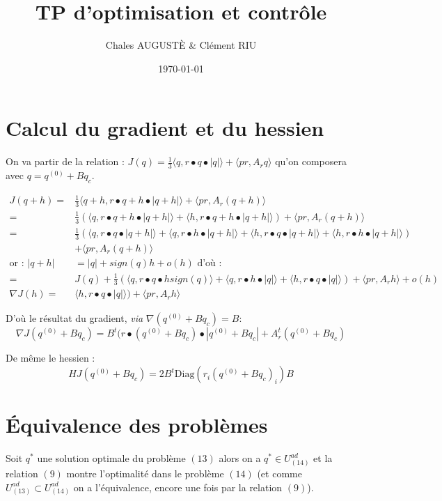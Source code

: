 \documentclass[12pt, letterpaper]{article}
\title{TP d'optimisation et contrôle}
\author{Chales AUGUSTÈ \& Clément RIU}
\date{\today}
\begin{document}
\section{Calcul du gradient et du hessien}

On va partir de la relation : $ J(q) = \frac{1}{3}\langle q , r \bullet q \bullet | q | \rangle + \langle pr , A_r q \rangle$ qu'on composera avec $q = q^{(0)} + B q_c$.

\begin{align*}
J(q+h) =& \frac{1}{3}\langle q + h , r \bullet q + h \bullet | q + h | \rangle + \langle pr , A_r (q + h) \rangle \\
=& \frac{1}{3}(\langle q , r \bullet q + h \bullet | q + h | \rangle + \langle h , r \bullet q + h \bullet | q + h | \rangle) + \langle pr , A_r (q + h) \rangle \\
=& \frac{1}{3}(\langle q , r \bullet q \bullet | q + h | \rangle + \langle q , r \bullet h \bullet | q + h | \rangle + \langle h , r \bullet q \bullet | q + h | \rangle + \langle h , r \bullet h \bullet | q + h | \rangle) \\ &+ \langle pr , A_r (q + h) \rangle \\ 
\text{or : } | q + h | &= |q| + sign(q) h + o(h) \text{ d'où :} \\
=& J(q) + \frac{1}{3}(\langle q , r \bullet q \bullet h sign(q) \rangle + \langle q , r \bullet h \bullet | q | \rangle + \langle h , r \bullet q \bullet | q | \rangle) + \langle pr , A_r h \rangle + o(h) \\
\nabla J(h) =& \langle h , r \bullet q \bullet | q | \rangle) + \langle pr , A_r h \rangle
\end{align*}

D'où le résultat du gradient, \emph{via} $\nabla(q^{(0)} + B q_c) = B$: 
$$ \nabla J (q^{(0)} + B q_c) = B^t(r \bullet (q^{(0)} + B q_c) \bullet | q^{(0)} + B q_c | + A_r^t(q^{(0)} + B q_c) $$

De même le hessien :
$$ H J (q^{(0)} + B q_c) = 2 B^t \text{Diag}(r_i (q^{(0)} + B q_c)_i) B $$

\section{Équivalence des problèmes}

Soit $q^*$ une solution optimale du problème $(13)$ alors on a $q^* \in U^{ad}_{(14)}$ et la relation $(9)$ montre l'optimalité dans le problème $(14)$ (et comme $U_{(13)}^{ad} \subset U_{(14)}^{ad}$ on a l'équivalence, encore une fois par la relation $(9)$).
\end{document}
